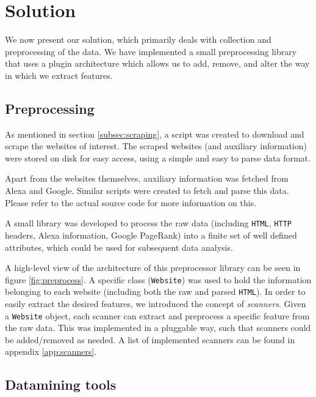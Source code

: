 \section{Solution}
\label{sec:solution}

We now present our solution, which primarily deals with collection and preprocessing of the data. We have implemented a small preprocessing library that uses a plugin architecture which allows us to add, remove, and alter the way in which we extract features.

\subsection{Preprocessing}
\label{subsec:preprocessing}


As mentioned in section \ref{subsec:scraping}, a script was created to download and scrape the websites of interest. The scraped websites (and auxiliary information) were stored on disk for easy access, using a simple and easy to parse data format.

Apart from the websites themselves, auxiliary information was fetched from Alexa and Google. Similar scripts were created to fetch and parse this data. Please refer to the actual source code for more information on this.

A small library was developed to process the raw data (including \texttt{HTML}, \texttt{HTTP} headers, Alexa information, Google PageRank) into a finite set of well defined attributes, which could be used for subsequent data analysis.

A high-level view of the architecture of this preprocessor library can be seen in figure \ref{fig:preprocess}. A specific class (\texttt{Website}) was used to hold the information belonging to each website (including both the raw and parsed \texttt{HTML}). In order to easily extract the desired features, we introduced the concept of \textit{scanners}. Given a \texttt{Website} object, each scanner can extract and preprocess a specific feature from the raw data. This was implemented in a pluggable way, such that scanners could be added/removed as needed. A list of implemented scanners can be found in appendix \ref{app:scanners}.


\subsection{Datamining tools}
\label{subsec:weka}

